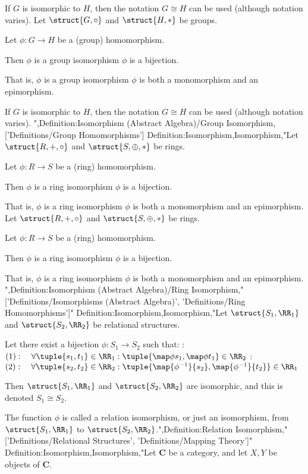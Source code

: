 If $G$ is isomorphic to $H$, then the notation $G \cong H$ can be used (although notation varies).
Let $\struct {G, \circ}$ and $\struct {H, *}$ be groups.

Let $\phi: G \to H$ be a (group) homomorphism.


Then $\phi$ is a group isomorphism  $\phi$ is a bijection.


That is, $\phi$ is a group isomorphism  $\phi$ is both a monomorphism and an epimorphism.


If $G$ is isomorphic to $H$, then the notation $G \cong H$ can be used (although notation varies).
",Definition:Isomorphism (Abstract Algebra)/Group Isomorphism,['Definitions/Group Homomorphisms']
Definition:Isomorphism,Isomorphism,"Let $\struct {R, +, \circ}$ and $\struct {S, \oplus, *}$ be rings.

Let $\phi: R \to S$ be a (ring) homomorphism.


Then $\phi$ is a ring isomorphism  $\phi$ is a bijection.

That is, $\phi$ is a ring isomorphism  $\phi$ is both a monomorphism and an epimorphism.
Let $\struct {R, +, \circ}$ and $\struct {S, \oplus, *}$ be rings.

Let $\phi: R \to S$ be a (ring) homomorphism.


Then $\phi$ is a ring isomorphism  $\phi$ is a bijection.

That is, $\phi$ is a ring isomorphism  $\phi$ is both a monomorphism and an epimorphism.
",Definition:Isomorphism (Abstract Algebra)/Ring Isomorphism,"['Definitions/Isomorphisms (Abstract Algebra)', 'Definitions/Ring Homomorphisms']"
Definition:Isomorphism,Isomorphism,"Let $\struct {S_1, \RR_1}$ and $\struct {S_2, \RR_2}$ be relational structures.

Let there exist a bijection $\phi: S_1 \to S_2$ such that:
:$(1): \quad \forall \tuple {s_1, t_1} \in \RR_1: \tuple {\map \phi {s_1}, \map \phi {t_1} } \in \RR_2$
:$(2): \quad \forall \tuple {s_2, t_2} \in \RR_2: \tuple {\map {\phi^{-1} } {s_2}, \map {\phi^{-1} } {t_2} } \in \RR_1$


Then $\struct {S_1, \RR_1}$ and $\struct {S_2, \RR_2}$ are isomorphic, and this is denoted $S_1 \cong S_2$.


The function $\phi$ is called a relation isomorphism, or just an isomorphism, from $\struct {S_1, \RR_1}$ to $\struct {S_2, \RR_2}$.",Definition:Relation Isomorphism,"['Definitions/Relational Structures', 'Definitions/Mapping Theory']"
Definition:Isomorphism,Isomorphism,"Let $\mathbf C$ be a category, and let $X, Y$ be objects of $\mathbf C$.


